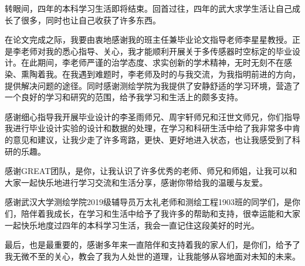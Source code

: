 
转眼间，四年的本科学习生活即将结束。回首过往，四年的武大求学生活让自己成长了很多，同时也让自己收获了许多东西。

在论文完成之际，我要由衷地感谢我的班主任兼毕业论文指导老师李星星教授。正是李老师对我的悉心指导、关心，我才能顺利开展关于多传感器时空标定的毕业设计。在此期间，李老师严谨的治学态度、求实创新的学术精神，无时无刻不在感染、熏陶着我。在我遇到难题时，李老师及时的与我交流，为我指明前进的方向，提供解决问题的途径。同时感谢测绘学院为我提供了安静舒适的学习环境，营造了一个良好的学习和研究的范围，给予我学习和生活上的颇多支持。

感谢细心指导我开展毕业设计的李圣雨师兄、周宇轩师兄和汪世文师兄，你们指导我进行毕业设计实验的设计和数据的处理，在学习和科研生活中给了我非常多中肯的意见和建议，让我少走了许多弯路，更快、更好地进入状态，也让我感受到了科研的乐趣。

感谢GREAT团队，是你，让我认识了许多优秀的老师、师兄和师姐，让我可以和大家一起快乐地进行学习交流和生活分享，感谢你带给我的温暖与友爱。

感谢武汉大学测绘学院2019级辅导员万太礼老师和测绘工程1903班的同学们，是你们，陪伴着我成长，在学习和生活中给予了我许多的帮助和支持，很幸运能和大家一起快乐地度过四年的本科学习生活，我会一直记住这段美好的时光。

最后，也是最重要的，感谢多年来一直陪伴和支持着我的家人们，是你们，给予了我无微不至的关心，教会了我为人处世的道理，让我能够从容地面对未知的未来。